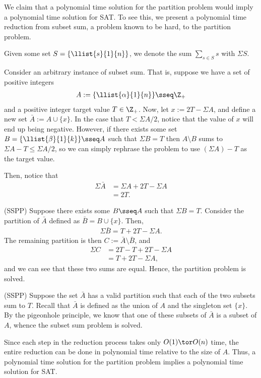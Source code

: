 \documentclass{article}
\begin{document}
\begin{solution}
We claim that a polynomial time solution for the partition problem would imply a polynomial time solution for SAT. To see this, we present a polynomial time reduction from subset sum, a problem known to be hard, to the partition problem.

\begin{note}[Notation]
Given some set $ S = \{\llist{s}{1}{n}\}$, we denote the sum $ \sum\limits_{s\in S}s $ with  $  \Sigma S $.
\end{note}

Consider an arbitrary instance of subset sum.
That is, suppose we have a set of positive integers \begin{align*}
  A := \{\llist{\alpha}{1}{n}\} \sseq \Z_+
\end{align*}
and a positive integer target value $ T\in \Z_+ $.
Now, let $ x := 2T-\Sigma A $, and define a new set $ \bar A := A\cup \{x\}$.
In the case that $ T < \Sigma A/{2} $, notice that the value of $ x $ will end up being negative.
However, if there exists some set $ B = \{\llist{\beta}{1}{k}\}\sseq A $ such that $ \Sigma B = T $ then $ A\setminus B $ sums to $ \Sigma A - T \leq \Sigma A/{2} $, so we can simply rephrase the problem to use $ (\Sigma A)- T$ as the target value.

Then, notice that \begin{align*}
  \Sigma \bar A &= \Sigma A + 2T-\Sigma A \\
  &= 2T.
\end{align*}
\begin{subproof}[Correctness.] (SS\imp PP)
  Suppose there exists some $ B\sseq A $ such that $ \Sigma B = T $.
  Consider the partition of $ \bar A $ defined as $ \bar B = B\cup \{x\} $.
  Then, \begin{align*}
    \Sigma \bar B= T + 2T-\Sigma A.
  \end{align*}
  The remaining partition is then $ C := \bar A\setminus \bar B $, and \begin{align*}
  \Sigma C &= 2T- T + 2T-\Sigma A \\
  &= T + 2T-\Sigma A,
  \end{align*}
  and we can see that these two sums are equal.
  Hence, the partition problem is solved.

  (SS\pmi PP)
  Suppose the set $ \bar A $ has a valid partition such that each of the two subsets sum to $ T $.
  Recall that $ \bar A $ is defined as the union of $ A $ and the singleton set $ \{x\} $.
  By the pigeonhole principle, we know that one of these subsets of $ \bar A $ is a subset of $ A $, whence the subset sum problem is solved.
\end{subproof}
Since each step in the reduction process takes only $ O(1)\tor O(n) $ time, the entire reduction can be done in polynomial time relative to the size of $ A $.
Thus, a polynomial time solution for the partition problem implies a polynomial time solution for SAT.
\end{solution}
\pagebreak
\end{document}
